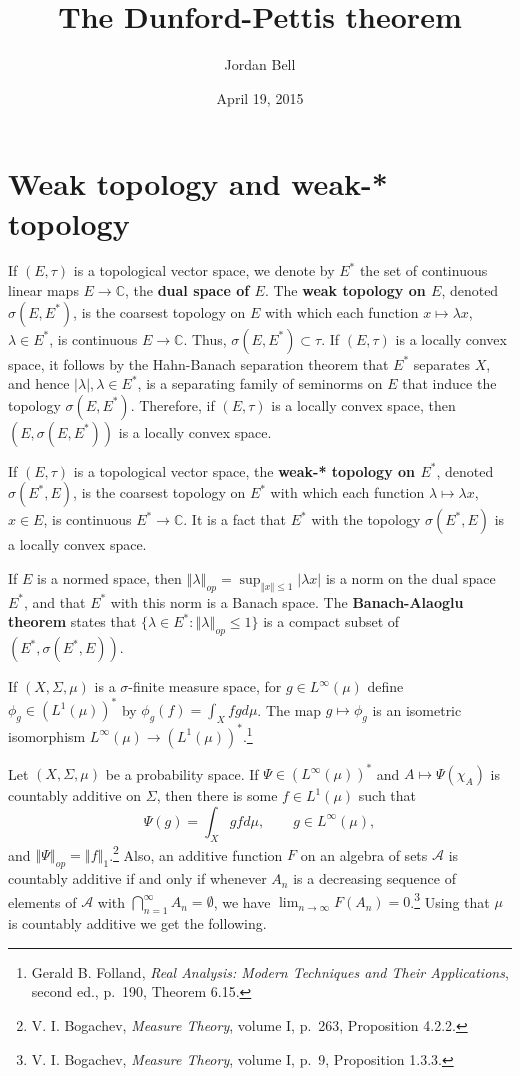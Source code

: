 \documentclass{article}
\newcommand{\norm}[1]{\left\Vert #1 \right\Vert}
\theoremstyle{definition}
\theoremstyle{definition}
\begin{document}
\title{The Dunford-Pettis theorem}
\author{Jordan Bell}
\date{April 19, 2015}

\maketitle

\section{Weak topology and weak-* topology}
If $(E,\tau)$ is a topological vector space, we denote by $E^*$ the set of continuous linear maps $E \to \mathbb{C}$, 
the \textbf{dual space of $E$}. 
The \textbf{weak topology on $E$}, denoted $\sigma(E,E^*)$, is the coarsest topology on $E$ with which
each function $x \mapsto \lambda x$, $\lambda \in E^*$, is continuous $E \to \mathbb{C}$.
Thus, $\sigma(E,E^*) \subset \tau$. 
If $(E,\tau)$ is a locally convex space, it follows by the Hahn-Banach separation theorem that $E^*$ separates $X$, and hence 
$|\lambda|, \lambda \in E^*$, is a separating family of seminorms on $E$ that induce the topology $\sigma(E,E^*)$. Therefore,
if $(E,\tau)$ is a locally convex space, then $(E,\sigma(E,E^*))$ is a locally convex space. 

If $(E,\tau)$ is a topological vector space, the \textbf{weak-* topology on $E^*$}, denoted
$\sigma(E^*,E)$, is the coarsest topology on $E^*$ with which each function
$\lambda \mapsto \lambda x$, $x \in E$, is continuous $E^* \to \mathbb{C}$. It is a fact that  $E^*$ with the topology
$\sigma(E^*,E)$ is a locally convex space.

If $E$ is a normed space, then $\norm{\lambda}_{op} = \sup_{\norm{x} \leq 1} |\lambda x|$ is a norm on the dual
space $E^*$, and that $E^*$ with this norm is a Banach space. The \textbf{Banach-Alaoglu theorem} states that $\{\lambda \in E^*: \norm{\lambda}_{op} \leq 1\}$
is a compact subset of $(E^*, \sigma(E^*,E))$.


If $(X,\Sigma,\mu)$ is a $\sigma$-finite measure space, for
$g \in L^\infty(\mu)$ define $\phi_g \in (L^1(\mu))^*$ by
$\phi_g(f) = \int_X fg d\mu$. The map
$g \mapsto \phi_g$ is an isometric isomorphism
$L^\infty(\mu) \to  (L^1(\mu))^*$.\footnote{Gerald B. Folland, {\em Real Analysis: Modern Techniques and Their Applications},
second ed., p.~190, Theorem 6.15.} 





Let $(X,\Sigma,\mu)$ be a probability space. If $\Psi \in (L^\infty(\mu))^*$ and $A \mapsto \Psi(\chi_A)$ is countably
additive on $\Sigma$, then there is some $f \in L^1(\mu)$ such that
\[
\Psi(g) = \int_X g f d\mu, \qquad g \in L^\infty(\mu),
\]
and $\norm{\Psi}_{op} = \norm{f}_1$.\footnote{V. I. Bogachev, {\em Measure Theory}, volume I,
p.~263, Proposition 4.2.2.}
Also, an additive  function $F$ on an algebra of sets $\mathscr{A}$ is countably additive
if and only if whenever $A_n$ is a decreasing sequence of elements of $\mathscr{A}$ with
$\bigcap_{n=1}^\infty A_n = \emptyset$, we have $\lim_{n\to \infty} F(A_n) = 0$.\footnote{V. I. Bogachev, {\em Measure Theory}, volume I,
p.~9, Proposition 1.3.3.} 
Using that $\mu$ is countably additive we get the following.
\end{document}
